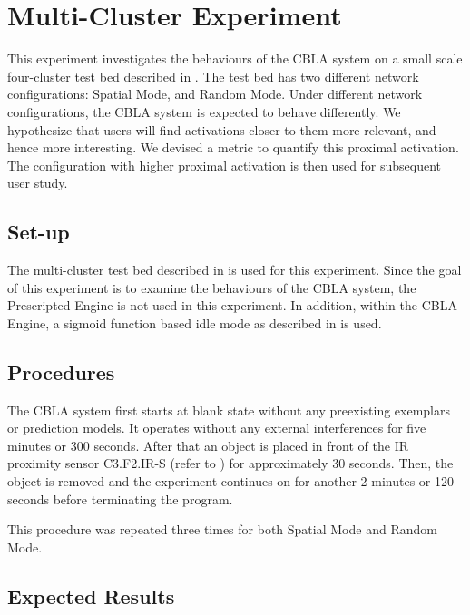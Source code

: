 \section{Multi-Cluster Experiment}\label{sec:multi-cluster-experiment}

This experiment investigates the behaviours of the CBLA system on a small scale four-cluster test bed described in . The test bed has two different network configurations: Spatial Mode, and Random Mode. Under different network configurations, the CBLA system is expected to behave differently. We hypothesize that users will find activations closer to them more relevant, and hence more interesting. We devised a metric to quantify this proximal activation. The configuration with higher proximal activation is then used for subsequent user study. 

\subsection{Set-up}\label{sec:multi-cluster-setup}

The multi-cluster test bed described in  is used for this experiment. Since the goal of this experiment is to examine the behaviours of the CBLA system, the Prescripted Engine is not used in this experiment. In addition, within the CBLA Engine, a sigmoid function based idle mode as described in  is used.

\subsection{Procedures}

The CBLA system first starts at blank state without any preexisting exemplars or prediction models. It operates without any external interferences for five minutes or 300 seconds. After that an object is placed in front of the IR proximity sensor C3.F2.IR-S (refer to ) for approximately 30 seconds. Then, the object is removed and the experiment continues on for another 2 minutes or 120 seconds before terminating the program.

This procedure was repeated three times for both Spatial Mode and Random Mode.

\subsection{Expected Results}


